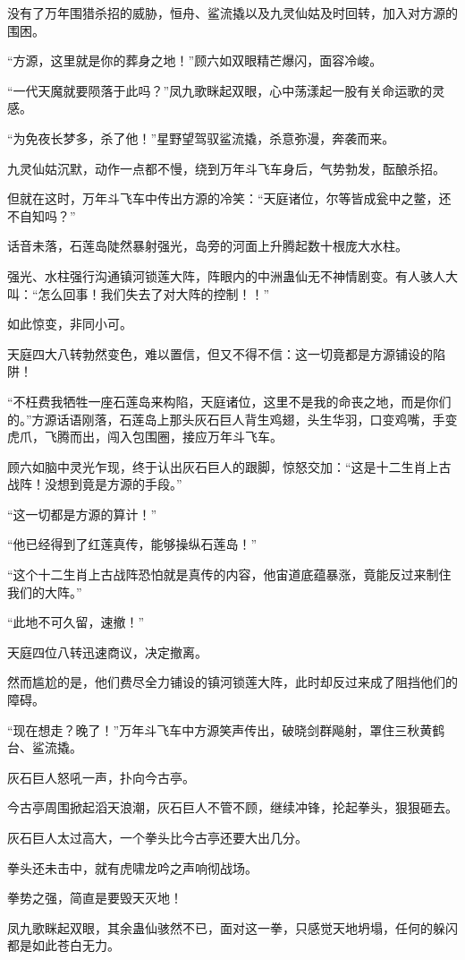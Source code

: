 \begin{this_body}
没有了万年围猎杀招的威胁，恒舟、鲨流撬以及九灵仙姑及时回转，加入对方源的围困。

“方源，这里就是你的葬身之地！”顾六如双眼精芒爆闪，面容冷峻。

“一代天魔就要陨落于此吗？”凤九歌眯起双眼，心中荡漾起一股有关命运歌的灵感。

“为免夜长梦多，杀了他！”星野望驾驭鲨流撬，杀意弥漫，奔袭而来。

九灵仙姑沉默，动作一点都不慢，绕到万年斗飞车身后，气势勃发，酝酿杀招。

但就在这时，万年斗飞车中传出方源的冷笑：“天庭诸位，尔等皆成瓮中之鳖，还不自知吗？”

话音未落，石莲岛陡然暴射强光，岛旁的河面上升腾起数十根庞大水柱。

强光、水柱强行沟通镇河锁莲大阵，阵眼内的中洲蛊仙无不神情剧变。有人骇人大叫：“怎么回事！我们失去了对大阵的控制！！”

如此惊变，非同小可。

天庭四大八转勃然变色，难以置信，但又不得不信：这一切竟都是方源铺设的陷阱！

“不枉费我牺牲一座石莲岛来构陷，天庭诸位，这里不是我的命丧之地，而是你们的。”方源话语刚落，石莲岛上那头灰石巨人背生鸡翅，头生华羽，口变鸡嘴，手变虎爪，飞腾而出，闯入包围圈，接应万年斗飞车。

顾六如脑中灵光乍现，终于认出灰石巨人的跟脚，惊怒交加：“这是十二生肖上古战阵！没想到竟是方源的手段。”

“这一切都是方源的算计！”

“他已经得到了红莲真传，能够操纵石莲岛！”

“这个十二生肖上古战阵恐怕就是真传的内容，他宙道底蕴暴涨，竟能反过来制住我们的大阵。”

“此地不可久留，速撤！”

天庭四位八转迅速商议，决定撤离。

然而尴尬的是，他们费尽全力铺设的镇河锁莲大阵，此时却反过来成了阻挡他们的障碍。

“现在想走？晚了！”万年斗飞车中方源笑声传出，破晓剑群飚射，罩住三秋黄鹤台、鲨流撬。

灰石巨人怒吼一声，扑向今古亭。

今古亭周围掀起滔天浪潮，灰石巨人不管不顾，继续冲锋，抡起拳头，狠狠砸去。

灰石巨人太过高大，一个拳头比今古亭还要大出几分。

拳头还未击中，就有虎啸龙吟之声响彻战场。

拳势之强，简直是要毁天灭地！

凤九歌眯起双眼，其余蛊仙骇然不已，面对这一拳，只感觉天地坍塌，任何的躲闪都是如此苍白无力。


\end{this_body}
